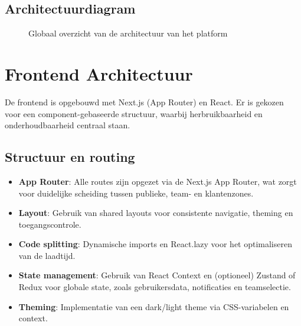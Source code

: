 \subsection{Architectuurdiagram}
\begin{figure}[h]
    \centering
    \caption{Globaal overzicht van de architectuur van het platform}
    \label{fig:architectuur-overzicht}
\end{figure}

\section{Frontend Architectuur}
\label{sec:frontend-architectuur}

De frontend is opgebouwd met Next.js (App Router) en React. Er is gekozen voor een component-gebaseerde structuur, waarbij herbruikbaarheid en onderhoudbaarheid centraal staan.

\subsection{Structuur en routing}
\begin{itemize}
    \item \textbf{App Router}: Alle routes zijn opgezet via de Next.js App Router, wat zorgt voor duidelijke scheiding tussen publieke, team- en klantenzones.
    \item \textbf{Layout}: Gebruik van shared layouts voor consistente navigatie, theming en toegangscontrole.
    \item \textbf{Code splitting}: Dynamische imports en React.lazy voor het optimaliseren van de laadtijd.
    \item \textbf{State management}: Gebruik van React Context en (optioneel) Zustand of Redux voor globale state, zoals gebruikersdata, notificaties en teamselectie.
    \item \textbf{Theming}: Implementatie van een dark/light theme via CSS-variabelen en context.
\end{itemize}

